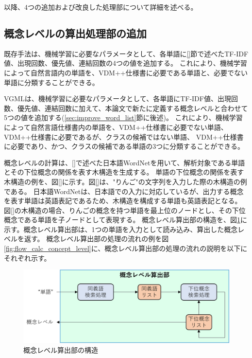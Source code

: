以降、4つの追加および改良した処理部について詳細を述べる。

\subsection{概念レベルの算出処理部の追加}
\label{sec:part_calc_concept_level}
既存手法は、機械学習に必要なパラメータとして、各単語に\ref{}節で述べたTF-IDF値、出現回数、優先値、連結回数の4つの値を追加する。
これにより、機械学習によって自然言語内の単語を、VDM++仕様書に必要である単語と、必要でない単語に分類することができる。

VGMLは、機械学習に必要なパラメータとして、各単語にTF-IDF値、出現回数、優先値、連結回数に加えて、本論文で新たに定義する概念レベルと合わせて5つの値を追加する(\ref{sec:improve_word_list}節に後述)。
これにより、機械学習によって自然言語仕様書内の単語を、VDM++仕様書に必要でない単語、VDM++仕様書に必要であるが、クラスの候補ではない単語、
VDM++仕様書に必要であり、かつ、クラスの候補である単語の3つに分類することができる。

概念レベルの計算は、\ref{}で述べた日本語WordNetを用いて、解析対象である単語とその下位概念の関係を表す木構造を生成する。
単語の下位概念の関係を表す木構造の例を、図\ref{}に示す。図\ref{}は、"りんご"の文字列を入力した際の木構造の例である。
日本語WordNetは、日本語での入力に対応しているが、出力する概念を表す単語は英語表記であるため、木構造を構成する単語も英語表記となる。
図\ref{}の木構造の場合、りんごの概念を持つ単語を最上位のノードとし、その下位概念である単語を子ノードとして表現する。
概念レベル算出部の構造を、図\ref{fig:vgml_concept_level_structure}に示す。概念レベル算出部は、1つの単語を入力として読み込み、算出した概念レベルを返す。
概念レベル算出部の処理の流れの例を図\ref{fig:flow_calc_concept_level}に、概念レベル算出部の処理の流れの説明を以下にそれぞれ示す。

\begin{figure}[t]
    \begin{center}
        \includegraphics[width=1.0\columnwidth]{image/vgml_concept_level_structure.png}
        \caption{概念レベル算出部の構造}
        \label{fig:vgml_concept_level_structure}
    \end{center}
\end{figure}

